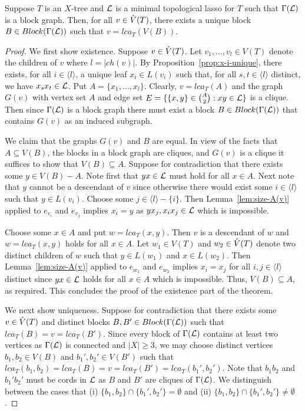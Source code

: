 \begin{thm}\label{theo:unique-block}
  Suppose $T$ is an $X$-tree and ${\mathcal L}$ is a minimal topological lasso for $T$
  such that $\Gamma({\mathcal L})$ is a block graph. Then, for all $v\in \mathring{V}(T)$, there
  exists a unique block $B\in Block(\Gamma({\mathcal L}))$ such that $v=lca_T(V(B))$.
\end{thm}
\begin{proof}
  We first show existence. Suppose $v\in \mathring{V}(T)$. Let $v_1,\ldots,v_l\in V(T)$
  denote the children of $v$ where $l=|ch(v)|$.  By
  Proposition~\ref{prop:x-i-unique}, there exists, for all $i\in\langle
  l\rangle$, a unique leaf $x_i\in L(v_i)$ such that, for all $s,t\in \langle
  l\rangle$ distinct, we have $x_sx_t\in {\mathcal L}$. Put $A=\{x_1,\ldots,x_l\}$.
  Clearly, $v=lca_T(A)$ and the graph $G(v)$ with vertex set $A$ and edge set
  $E=\{\{x,y\}\in {A\choose 2}: xy\in{\mathcal L}\}$ is a clique.  Then since
  $\Gamma({\mathcal L})$ is a block graph there must exist a block $B\in
  Block(\Gamma({\mathcal L}))$ that contains $G(v)$ as an induced subgraph.

  We claim that the graphs $G(v)$ and $B$ are equal.  In view of the facts
  that $A\subseteq V(B)$, the blocks in a block graph are cliques, and $G(v)$
  is a clique it suffices to show that $V(B)\subseteq A$. Suppose for
  contradiction that there exists some $y\in V(B)-A$. Note first that $yx\in
  {\mathcal L}$ must hold for all $x\in A$.  Next note that $y$ cannot be a descendant
  of $v$ since otherwise there would exist some $i\in\langle l\rangle$ such
  that $y\in L(v_i)$. Choose some $j\in \langle l\rangle-\{i\}$. Then
  Lemma~\ref{lem:size-A(v)} applied to $e_{v_i}$ and $e_{v_j}$ implies $x_i=y$
  as $yx_j,x_ix_j\in{\mathcal L}$ which is impossible.

  Choose some $x\in A$ and put $w=lca_T(x,y)$. Then $v$ is a descendant of $w$
  and $w=lca_T(x,y)$ holds for all $x\in A$. Let $w_1\in V(T)$ and $w_2\in
  \mathring{V}(T)$ denote two distinct children of $w$ such that $y\in L(w_1)$ and
  $x\in L(w_2)$. Then Lemma~\ref{lem:size-A(v)} applied to $e_{w_1}$ and
  $e_{w_2}$ implies $x_i=x_j$ for all $i,j\in\langle l\rangle$ distinct since
  $yx\in{\mathcal L}$ holds for all $x\in A$ which is impossible.  Thus, $V(B)\subseteq
  A$, as required. This concludes the proof of the existence part of the
  theorem.

  We next show uniqueness.  Suppose for contradiction that there exists some
  $v\in \mathring{V}(T)$ and distinct blocks $B,B'\in Block(\Gamma({\mathcal L}))$ such that
  $lca_T(B)=v=lca_T(B')$.  Since every block of $\Gamma({\mathcal L})$ contains at
  least two vertices as $\Gamma({\mathcal L})$ is connected and $|X|\geq 3$, we may
  choose distinct vertices $b_1,b_2\in V(B)$ and $b_1',b_2'\in V(B')$ such
  that $lca_T(b_1,b_2)=lca_T(B)=v=lca_T(B')=lca_T(b_1',b_2')$.  Note that
  $b_1b_2$ and $b_1'b_2' $ must be cords in ${\mathcal L}$ as $B$ and $B'$ are cliques
  of $\Gamma({\mathcal L})$.  We distinguish between the cases that (i)
  $\{b_1,b_2\}\cap\{b_1',b_2'\}=\emptyset $ and (ii)
  $\{b_1,b_2\}\cap\{b_1',b_2'\}\not=\emptyset $.


\end{proof}

